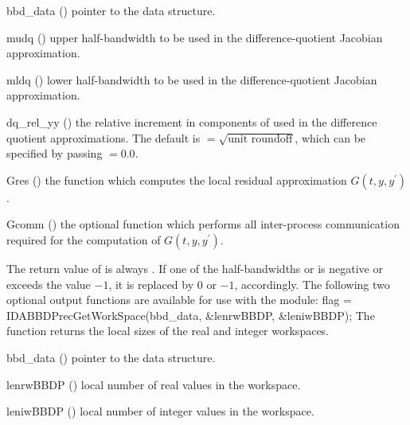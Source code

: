 {
  \begin{args}[dq\_rel\_yy]
  \item[bbd\_data] ()
    pointer to the {\idabbdpre} data structure.
  \item[mudq] ()
    upper half-bandwidth to be used in the difference-quotient Jacobian approximation.
  \item[mldq] ()
    lower half-bandwidth to be used in the difference-quotient Jacobian approximation.
  \item[dq\_rel\_yy] ()
    the relative increment in components of  used in the difference quotient
    approximations.  
    The default is  $= \sqrt{\text{unit roundoff}}$, which
    can be specified by passing  $= 0.0$.
  \item[Gres] ()
    the {\C} function which computes the local residual approximation 
    $G(t,y,y^\prime)$.
  \item[Gcomm] ()
    the optional {\C} function which performs all inter-process communication required
    for the computation of $G(t,y,y^\prime)$.
  \end{args}
}
{
  The return value of  is always .
}
{
  If one of the half-bandwidths  or  is negative or
  exceeds the value $-1$, it is replaced by 0 or $-1$,
  accordingly.
}
The following two optional output functions are available for use with
the {\idabbdpre} module:
{
  flag = IDABBDPrecGetWorkSpace(bbd\_data, \&lenrwBBDP, \&leniwBBDP);
}
{
  The function  returns the local sizes
  of the {\idabbdpre} real and integer workspaces.
}
{
  \begin{args}[lenrwBBDP]
  \item[bbd\_data] ()
    pointer to the {\idabbdpre} data structure.
  \item[lenrwBBDP] ()
    local number of real values in the {\idabbdpre} workspace.
  \item[leniwBBDP] ()
    local number of integer values in the {\idabbdpre} workspace.
  \end{args}
}
